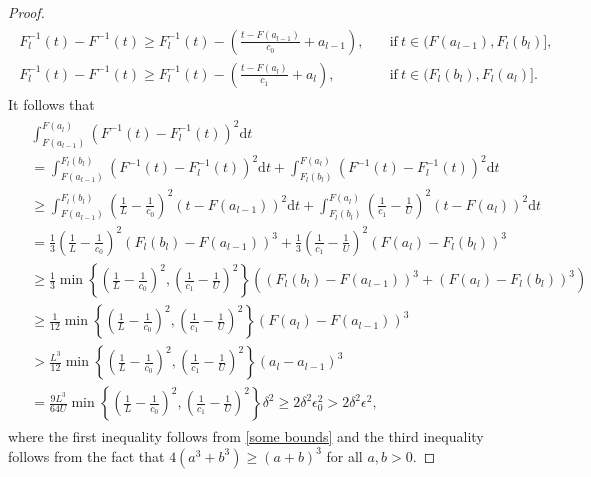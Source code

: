 \documentclass[11pt]{article}
\numberwithin{equation}{section}
\begin{document}
\begin{proof}
\begin{align}
    \begin{split}
    F_l^{-1}(t)-F^{-1}(t)\ge F_l^{-1}(t)-\left(\frac{t-F(a_{l-1})}{c_0} + a_{l-1}\right), \quad &\text{if}~t \in (F(a_{l-1}), F_l(b_l)], \\
    F_l^{-1}(t)-F^{-1}(t)\ge F_l^{-1}(t)-\left(\frac{t-F(a_{l})}{c_1} + a_{l}\right), \quad &\text{if}~t \in (F_l(b_l), F_l(a_l)].
    \end{split}
    \end{align}
    It follows that
    \begin{align}\begin{split} \label{eq:7.33_2}
        & \int_{F(a_{l-1})}^{F(a_l)} \left(F^{-1}(t) - F_l^{-1}(t) \right)^2 \mathrm{d}t \\
        & = \int_{F(a_{l-1})}^{F_l(b_l)} \left(F^{-1}(t) - F_l^{-1}(t) \right)^2 \mathrm{d}t + \int_{F_l(b_{l})}^{F(a_l)} \left(F^{-1}(t) - F_l^{-1}(t) \right)^2 \mathrm{d}t \\
        & \ge \int_{F(a_{l-1})}^{F_l(b_l)} \left( \frac{1}{L} - \frac{1}{c_0} \right)^2 \left( t-F(a_{l-1}) \right)^2 \mathrm{d}t + \int_{F_l(b_{l})}^{F(a_l)} \left( \frac{1}{c_1} - \frac{1}{U} \right)^2 \left( t-F(a_{l}) \right)^2 \mathrm{d}t \\
        & = \frac{1}{3} \left( \frac{1}{L} - \frac{1}{c_0} \right)^2 \left( F_l(b_l)-F(a_{l-1}) \right)^3 + \frac{1}{3} \left( \frac{1}{c_1} - \frac{1}{U} \right)^2 \left( F(a_l)-F_l(b_l) \right)^3 \\
        & \ge \frac{1}{3} \min \left\{ \left( \frac{1}{L} - \frac{1}{c_0} \right)^2, \left( \frac{1}{c_1} - \frac{1}{U} \right)^2 \right\} \left( \left( F_l(b_l)-F(a_{l-1}) \right)^3 + \left( F(a_l)-F_l(b_l) \right)^3 \right) \\
        & \ge \frac{1}{12} \min \left\{ \left( \frac{1}{L} - \frac{1}{c_0} \right)^2, \left( \frac{1}{c_1} - \frac{1}{U} \right)^2 \right\} \left( F(a_l)-F(a_{l-1}) \right)^3 \\
        & > \frac{L^3}{12} \min \left\{ \left( \frac{1}{L} - \frac{1}{c_0} \right)^2, \left( \frac{1}{c_1} - \frac{1}{U} \right)^2 \right\} \left( a_l-a_{l-1} \right)^3 \\
        & = \frac{9L^3}{64U} \min \left\{ \left( \frac{1}{L} - \frac{1}{c_0} \right)^2, \left( \frac{1}{c_1} - \frac{1}{U} \right)^2 \right\} \delta^2 \ge 2 \delta^2 \epsilon_0^2 > 2 \delta^2 \epsilon^2,
    \end{split} \end{align}
    where the first inequality follows from \eqref{some bounds} and the third inequality follows from the fact that $4(a^3+b^3)\ge(a+b)^3$ for all $a,b>0$.

\end{proof}
\end{document}
